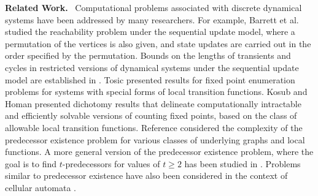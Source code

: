 \noindent
\textbf{Related Work.}~
Computational problems associated with 
discrete dynamical systems 
have been addressed by many researchers.
For example, Barrett et al. \cite{BH+06} studied the
reachability problem under the sequential
update model, where a permutation of the vertices is also given,
and state updates are carried out in the order specified by the
permutation.  
Bounds on the lengths of transients and cycles in restricted versions
of dynamical systems under the sequential update model are established
in \cite{MR-2007}.  
Tosic \cite{Tos-2010,Tosic-2017} presented results for fixed point enumeration
problems for systems with special forms of local transition
functions.  Kosub and Homan \cite{KH-2007} presented dichotomy
results that delineate computationally intractable and efficiently
solvable versions of counting fixed points, based on the class of
allowable local transition functions.  
Reference \cite{BH+07} considered the complexity
of the predecessor existence problem for various classes
of underlying graphs and local functions.
A more general version of the predecessor existence problem,
where the goal is to find $t$-predecessors for values of $t \geq 2$
has been studied in \cite{Kawachi-et-al-2017,MR+2018}.
Problems similar to predecessor existence have
also been considered in the context of cellular automata
\cite{Gre-1987,Dur-1994}.
